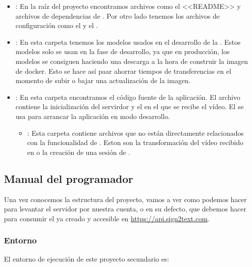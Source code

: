 \begin{itemize}

  \item \prog{/}: En la raíz del proyecto encontramos archivos como el <<README>> y archivos de dependencias de . Por otro lado tenemos los archivos de configuración como el  y el .

  \item {}: En esta carpeta tenemos los modelos usados en el desarrollo de la . Estos modelos solo se usan en la fase de desarrollo, ya que en producción, los modelos se consiguen haciendo una descarga a la hora de construir la imagen de docker. Esto se hace así paar ahorrar tiempos de transferencias en el momento de subir o bajar una actualización de la imagen.

  \item {}: En esta carpeta encontramos el código fuente de la aplicación. El archivo  contiene la inicialización del servirdor y el  en el que se recibe el vídeo. El   se usa para arrancar la aplicación en modo desarrollo.
        \begin{itemize}
          \item {}: Esta carpeta contiene archivos que no están directamente relacionados con la funcionalidad de . Eston son la transformación del vídeo recibido en  o la creación de una sesión de .
        \end{itemize}

\end{itemize}

\subsection{Manual del programador}

Una vez conocemos la estructura del proyecto, vamos a ver como podemos hacer para levantar el servidor por nuestra cuenta, o en su defecto, que debemos hacer para consumir el  ya creado y accesible en \url{https://api.sign2text.com}.

\subsubsection{Entorno}

El entorno de ejecución de este proyecto secundario es:

